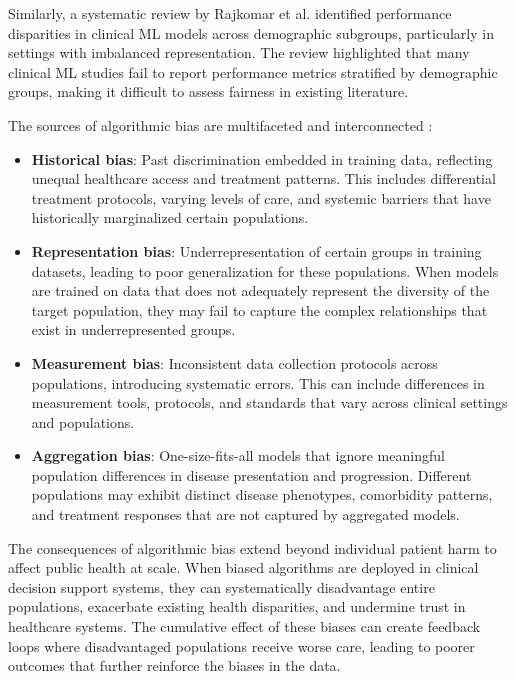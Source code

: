 Similarly, a systematic review by Rajkomar et al. \cite{rajkomar2018} 
identified performance disparities in clinical ML models across demographic 
subgroups, particularly in settings with imbalanced representation. The 
review highlighted that many clinical ML studies fail to report performance 
metrics stratified by demographic groups, making it difficult to assess 
fairness in existing literature.

The sources of algorithmic bias are multifaceted and interconnected 
\cite{mehrabi2021}:

\begin{itemize}[leftmargin=*]
    \item \textbf{Historical bias}: Past discrimination embedded in training 
          data, reflecting unequal healthcare access and treatment patterns. 
          This includes differential treatment protocols, varying levels of 
          care, and systemic barriers that have historically marginalized 
          certain populations.
    \item \textbf{Representation bias}: Underrepresentation of certain groups 
          in training datasets, leading to poor generalization for these 
          populations. When models are trained on data that does not adequately 
          represent the diversity of the target population, they may fail to 
          capture the complex relationships that exist in underrepresented 
          groups.
    \item \textbf{Measurement bias}: Inconsistent data collection protocols 
          across populations, introducing systematic errors. This can include 
          differences in measurement tools, protocols, and standards that 
          vary across clinical settings and populations.
    \item \textbf{Aggregation bias}: One-size-fits-all models that ignore 
          meaningful population differences in disease presentation and 
          progression. Different populations may exhibit distinct disease 
          phenotypes, comorbidity patterns, and treatment responses that 
          are not captured by aggregated models.
\end{itemize}

The consequences of algorithmic bias extend beyond individual patient harm 
to affect public health at scale. When biased algorithms are deployed in 
clinical decision support systems, they can systematically disadvantage 
entire populations, exacerbate existing health disparities, and undermine 
trust in healthcare systems. The cumulative effect of these biases can 
create feedback loops where disadvantaged populations receive worse care, 
leading to poorer outcomes that further reinforce the biases in the data.

